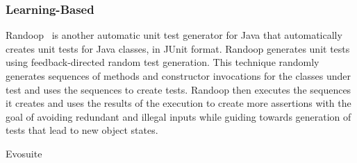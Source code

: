 \cite{xie2009improving}

\subsubsection{Learning-Based}


Randoop~\cite{pacheco2007feedback} is another automatic unit test generator for Java that automatically creates unit tests for Java classes, in JUnit format.  Randoop generates unit tests using feedback-directed random test generation. This technique randomly generates sequences of methods and constructor invocations for the classes under test and uses
the sequences to create tests. Randoop then executes the sequences it creates and uses the results of the execution to create more assertions with the goal of avoiding redundant and illegal inputs while guiding towards generation of tests that lead to new object states. 

Evosuite
